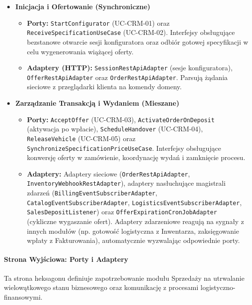 \begin{itemize}
    \item \textbf{Inicjacja i Ofertowanie (Synchroniczne)}
    \begin{itemize}
        \item \textbf{Porty:} \texttt{StartConfigurator} (UC-CRM-01) oraz \texttt{ReceiveSpecificationUseCase} (UC-CRM-02). Interfejsy obsługujące bezstanowe otwarcie sesji konfiguratora oraz odbiór gotowej specyfikacji w celu wygenerowania wiążącej oferty.
        \item \textbf{Adaptery (HTTP):} \texttt{SessionRestApiAdapter} (sesje konfiguratora), \texttt{OfferRestApiAdapter} oraz \texttt{OrderRestApiAdapter}. Parsują żądania sieciowe z przeglądarki klienta na komendy domeny.
    \end{itemize}

    \item \textbf{Zarządzanie Transakcją i Wydaniem (Mieszane)}
    \begin{itemize}
        \item \textbf{Porty:} \texttt{AcceptOffer} (UC-CRM-03), \texttt{ActivateOrderOnDeposit} (aktywacja po wpłacie), \texttt{ScheduleHandover} (UC-CRM-04), \texttt{ReleaseVehicle} (UC-CRM-05) oraz \texttt{SynchronizeSpecificationPriceUseCase}. Interfejsy obsługujące konwersję oferty w zamówienie, koordynację wydań i zamknięcie procesu.
        \item \textbf{Adaptery:} Adaptery sieciowe (\texttt{OrderRestApiAdapter}, \texttt{InventoryWebhookRestAdapter}), adaptery nasłuchujące magistrali zdarzeń (\texttt{BillingEventSubscriberAdapter}, \texttt{CatalogEventSubscriberAdapter}, \texttt{LogisticsEventSubscriberAdapter}, \texttt{SalesDepositListener}) oraz \texttt{OfferExpirationCronJobAdapter} (cykliczne wygaszanie ofert). Adaptery zdarzeniowe reagują na sygnały z innych modułów (np. gotowość logistyczna z Inwentarza, zaksięgowanie wpłaty z Fakturowania), automatycznie wyzwalając odpowiednie porty.
    \end{itemize}
\end{itemize}

\paragraph{Strona Wyjściowa: Porty i Adaptery} 
Ta strona heksagonu definiuje zapotrzebowanie modułu Sprzedaży na utrwalanie wielowątkowego stanu biznesowego oraz komunikację z procesami logistyczno-finansowymi.


